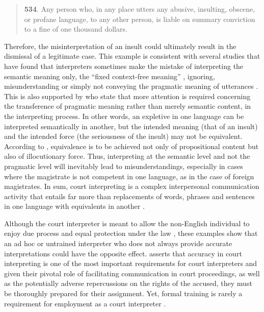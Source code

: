 \documentclass[output=paper,colorlinks,citecolor=brown]{langscibook}
\begin{document}
\begin{quote}
    \textbf{534}. Any person who, in any place utters any abusive, insulting, obscene, or profane language, to any other person, is liable on summary conviction to a fine of one thousand dollars.
\end{quote}

Therefore, the misinterpretation of an insult could ultimately result in the dismissal of a legitimate case. This example is consistent with several studies that have found that interpreters sometimes make the mistake of interpreting the semantic meaning only, the “fixed context-free meaning” \citep[29]{Cooke1996}, ignoring, misunderstanding or simply not conveying the pragmatic meaning of utterances \citep{Hale2004}. This is also supported by \citet[4]{Eades1999} who state that more attention is required concerning the transference of pragmatic meaning rather than merely semantic content, in the interpreting process. In other words, an expletive in one language can be interpreted semantically in another, but the intended meaning (that of an insult) and the intended force (the seriousness of the insult) may not be equivalent. According to \citet[76]{HatimMason1990}, equivalence is to be achieved not only of propositional content but also of illocutionary force. Thus, interpreting at the semantic level and not the pragmatic level will inevitably lead to misunderstandings, especially in cases where the magistrate is not competent in one language, as in the case of foreign magistrates. In sum, court interpreting is a complex interpersonal communication activity that entails far more than replacements of words, phrases and sentences in one language with equivalents in another \citep[133]{Moeketsi2001}.

Although the court interpreter is meant to allow the non-English individual to enjoy due process and equal protection under the law \citep{Arzoz2007}, these examples show that an ad hoc or untrained interpreter who does not always provide accurate interpretations could have the opposite effect. \citet{Moeketsi2001} asserts that accuracy in court interpreting is one of the most important requirements for court interpreters and given their pivotal role of facilitating communication in court proceedings, as well as the potentially adverse repercussions on the rights of the accused, they must be thoroughly prepared for their assignment. Yet, formal training is rarely a requirement for employment as a court interpreter \citep{Hale2004}.
\end{document}
